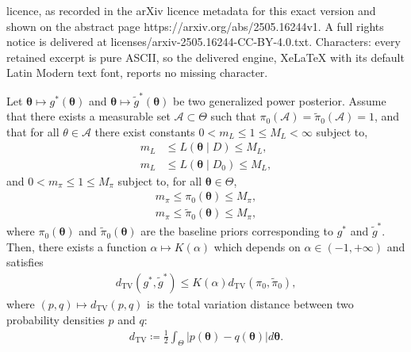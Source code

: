 \documentclass[10pt,a4paper]{amsart}
\begin{document}
licence, as recorded in the arXiv licence metadata for this exact version and shown on the abstract page https://arxiv.org/abs/2505.16244v1. A full rights notice is delivered at licenses/arxiv-2505.16244-CC-BY-4.0.txt. Characters: every retained excerpt is pure ASCII, so the delivered engine, XeLaTeX with its default Latin Modern text font, reports no missing character.
\begin{lemma}
    \label{lem:bound_total_variation_distance}
    Let $\bm{\theta} \mapsto g^*(\bm{\theta})$ and $\bm{\theta} \mapsto \tilde{g}^*(\bm{\theta})$ be two generalized power posterior.
    Assume that there exists a measurable set $\mathcal{A} \subset \Theta$ such that $\pi_0(\mathcal{A}) = \tilde{\pi}_0(\mathcal{A}) = 1$, and that for all $\theta \in \mathcal{A}$ there exist constants $0 < m_L \leq 1 \leq M_L < \infty$ subject to,
    \begin{align*}
        m_L &\leq L(\bm{\theta} \mid D) \leq M_L, \\
        m_L &\leq L(\bm{\theta} \mid D_0) \leq M_L,
    \end{align*}
    and $0 < m_\pi \leq 1 \leq M_\pi$ subject to, for all $\bm{\theta} \in \Theta$,
    \begin{align*}
        m_\pi \leq \pi_0(\bm{\theta}) \leq M_\pi, \\
        m_\pi \leq \tilde{\pi}_0(\bm{\theta}) \leq M_\pi,
    \end{align*}
    where $\pi_0(\bm{\theta})$ and $\tilde{\pi}_0(\bm{\theta})$ are the baseline priors corresponding to $g^*$ and $\tilde{g}^*$.
    Then, there exists a function $\alpha \mapsto K(\alpha)$ which depends on $\alpha \in (-1, +\infty)$ and satisfies
    \begin{align}
        d_{\mathrm{TV}}(g^*, \tilde{g}^*) \leq K(\alpha) d_{\mathrm{TV}}(\pi_0, \tilde{\pi}_0), \label{eq:tv_bound_k_alpha}
    \end{align}
    where $(p, q) \mapsto d_{\mathrm{TV}}(p, q)$ is the total variation distance between two probability densities $p$ and $q$:
    \begin{align*}
        d_{\mathrm{TV}} \coloneqq \frac{1}{2}\int_\Theta \left|p(\bm{\theta}) - q(\bm{\theta}) \right| d\bm{\theta}.
    \end{align*}
\end{lemma}
\end{document}

